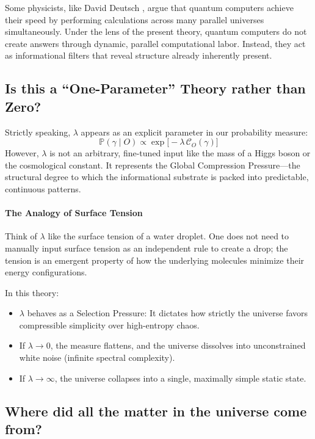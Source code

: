 Some physicists, like David Deutsch \cite{deutsch1997fabric}, argue that quantum computers achieve their speed by performing calculations across many parallel universes simultaneously.
Under the lens of the present theory, quantum computers do not create answers through dynamic, parallel computational labor.
Instead, they act as informational filters that reveal structure already inherently present.


\subsection*{Is this a ``One-Parameter'' Theory rather than Zero?}

Strictly speaking, $\lambda$ appears as an explicit parameter in our probability measure: 
\[
\mathbb{P}(\gamma \mid O) \propto \exp\bigl[-\lambda\, \mathcal{C}_O(\gamma)\bigr]
\]
However, $\lambda$ is not an arbitrary, fine-tuned input like the mass of a Higgs boson or the cosmological constant.
It represents the Global Compression Pressure—the structural degree to which the informational substrate is packed into predictable, continuous patterns.

\paragraph{The Analogy of Surface Tension}
Think of $\lambda$ like the surface tension of a water droplet.
One does not need to manually input surface tension as an independent rule to create a drop; the tension is an emergent property of how the underlying molecules minimize their energy configurations. 

In this theory:
\begin{itemize}
    \item $\lambda$ behaves as a Selection Pressure: It dictates how strictly the universe favors compressible simplicity over high-entropy chaos.
    \item If $\lambda \to 0$, the measure flattens, and the universe dissolves into unconstrained white noise (infinite spectral complexity).
    \item If $\lambda \to \infty$, the universe collapses into a single, maximally simple static state.
\end{itemize}


\subsection*{Where did all the matter in the universe come from?}

